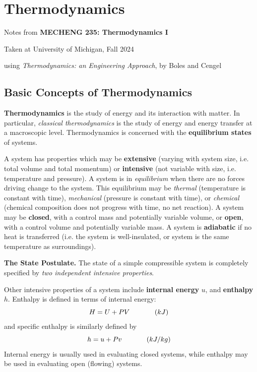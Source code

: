 \section{Thermodynamics}

\begin{center}
    Notes from \textbf{MECHENG 235: Thermodynamics I}

    Taken at University of Michigan, Fall 2024

    using \textit{Thermodynamics: an Engineering Approach}, by Boles and Cengel
\end{center}

\subsection{Basic Concepts of Thermodynamics}

\textbf{Thermodynamics} is the study of energy and its interaction with matter. In particular, \textit{classical thermodynamics} is the study of energy and energy transfer at a macroscopic level. Thermodynamics is concerned with the \textbf{equilibrium states} of systems.

A system has properties which may be \textbf{extensive} (varying with system size, i.e. total volume and total momentum) or \textbf{intensive} (not variable with size, i.e. temperature and pressure). A system is in \textit{equilibrium} when there are no forces driving change to the system. This equilibrium may be \textit{thermal} (temperature is constant with time), \textit{mechanical} (pressure is constant with time), or \textit{chemical} (chemical composition does not progress with time, no net reaction). A system may be \textbf{closed}, with a control mass and potentially variable volume, or \textbf{open}, with a control volume and potentially variable mass. A system is \textbf{adiabatic} if no heat is transferred (i.e. the system is well-insulated, or system is the same temperature as surroundings).

\begin{shaded}
    \textbf{The State Postulate.} The state of a simple compressible system is completely specified by \textit{two independent intensive properties}.
\end{shaded}

Other intensive properties of a system include \textbf{internal energy} $u$, and \textbf{enthalpy} $h$. Enthalpy is defined in terms of internal energy: \[H = U + PV\hspace{0.5in}(kJ)\] and specific enthalpy is similarly defined by \[h = u + Pv\hspace{0.5in}(kJ/kg)\] Internal energy is usually used in evaluating closed systems, while enthalpy may be used in evaluating open (flowing) systems.

